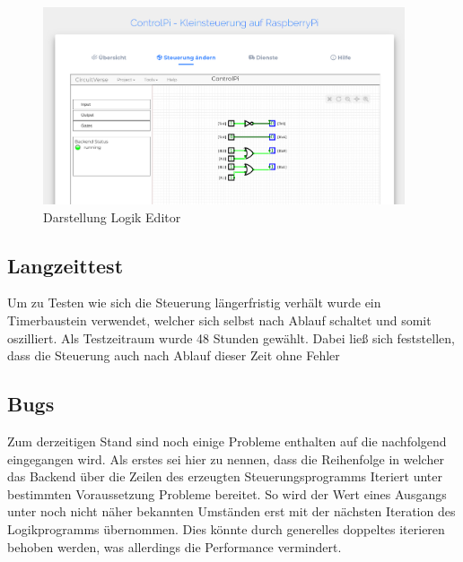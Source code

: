  \begin{figure}[H]
	\begin{center}
		\includegraphics[width=0.95\textwidth]{./images/FrontendAendern.png}
		\caption{Darstellung Logik Editor}
		\label{img:FrontendAenderung}
	\end{center} 
\end{figure}	

\subsection{Langzeittest}
Um zu Testen wie sich die Steuerung längerfristig verhält wurde ein Timerbaustein verwendet, welcher sich selbst nach Ablauf schaltet und somit oszilliert. Als Testzeitraum wurde 48 Stunden gewählt. Dabei ließ sich feststellen, dass die Steuerung auch nach Ablauf dieser Zeit ohne Fehler  

 \subsection{Bugs}
 Zum derzeitigen Stand sind noch einige Probleme enthalten auf die nachfolgend eingegangen wird. Als  erstes sei hier zu nennen, dass die Reihenfolge in welcher das Backend über die Zeilen des erzeugten Steuerungsprogramms Iteriert unter bestimmten Voraussetzung Probleme bereitet. So wird der Wert eines Ausgangs unter noch nicht näher bekannten Umständen erst mit der nächsten Iteration des Logikprogramms übernommen. Dies könnte durch generelles doppeltes iterieren behoben werden, was allerdings die Performance vermindert.
 
